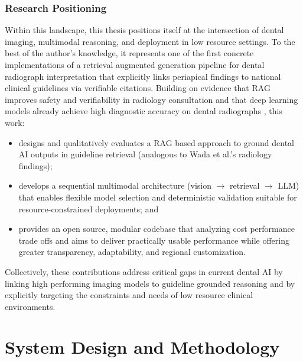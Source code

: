 \documentclass[12pt,a4paper]{report}
\begin{document}
	
	
	
	\subsection{Research Positioning}
	Within this landscape, this thesis positions itself at the intersection of
	dental imaging, multimodal reasoning, and deployment in low resource settings.
	To the best of the author's knowledge, it represents one of the first concrete
	implementations of a retrieval augmented generation pipeline for dental
	radiograph interpretation that explicitly links periapical findings to national
	clinical guidelines via verifiable citations. Building on evidence that RAG
	improves safety and verifiability in radiology consultation \cite{Wada2025RAGRadiology}
	and that deep learning models already achieve high diagnostic accuracy on dental
	radiographs \cite{Dashti2024DLCariesUmbrella,Arzani2025AICariesUmbrella}, this
	work:
	
	\begin{itemize}
		\item designs and qualitatively evaluates a RAG based approach to ground dental
		AI outputs in guideline retrieval (analogous to Wada et al.'s radiology
		findings);
		\item develops a sequential multimodal architecture (vision $\rightarrow$
		retrieval $\rightarrow$ LLM) that enables flexible model selection and
		deterministic validation suitable for resource-constrained deployments; and
		\item provides an open source, modular codebase that analyzing cost performance
		trade offs and aims to deliver practically usable performance while
		offering greater transparency, adaptability, and regional customization.
	\end{itemize}
	
	Collectively, these contributions address critical gaps in current dental AI by
	linking high performing imaging models to guideline grounded reasoning and by
	explicitly targeting the constraints and needs of low resource clinical
	environments.
	
	
	
	
	\chapter{System Design and Methodology}
	\label{chap:design}
	
\end{document}
